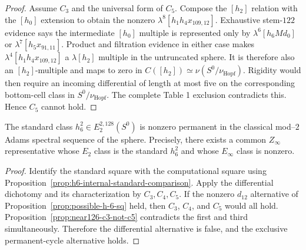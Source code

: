 \begin{proof}
  Assume $C_3$ and the universal form of $C_5$.  Compose the $[h_2]$ relation
  with the $[h_0]$ extension to obtain the nonzero
  $\lambda^8[h_1h_4x_{109,12}]$.  Exhaustive stem-$122$ evidence says the
  intermediate $[h_0]$ multiple is represented only by
  $\lambda^6[h_6Md_0]$ or $\lambda^7[h_5x_{91,11}]$.  Product and filtration
  evidence in either case makes
  $\lambda^4[h_1h_4x_{109,12}]$ a $\lambda[h_2]$ multiple in the untruncated
  sphere.  It is therefore also an $[h_2]$-multiple and maps to zero in
  $C([h_2])\simeq\nu(S^0/\nu_{\mathrm{Hopf}})$.  Rigidity would then require an
  incoming differential of length at most five on the corresponding
  bottom-cell class in $S^0/\nu_{\mathrm{Hopf}}$.  The complete Table 1 exclusion
  contradicts this.  Hence $C_5$ cannot hold.
\end{proof}



\begin{theorem}
  \label{thm:h6-square-permanent}
  \notready
  The standard class $h_6^2\in E_2^{2,128}(S^0)$ is nonzero permanent
  in the classical mod--$2$ Adams spectral sequence of the sphere.
  Precisely, there exists a common $Z_\infty$ representative whose
  $E_2$ class is the standard $h_6^2$ and whose $E_\infty$ class is nonzero.
\end{theorem}

\begin{proof}
  Identify the standard square with the computational square using
  Proposition~\ref{prop:h6-internal-standard-comparison}. Apply the
  differential dichotomy and its characterization by $C_3,C_4,C_5$.
  If the nonzero
  $d_{12}$ alternative of
  Proposition~\ref{prop:possible-h-6-sq} held, then $C_3$, $C_4$, and $C_5$ would
  all hold.  Proposition~\ref{prop:near126-c3-not-c5} contradicts the first and
  third simultaneously.  Therefore the differential alternative is false,
  and the exclusive permanent-cycle alternative holds.
\end{proof}
